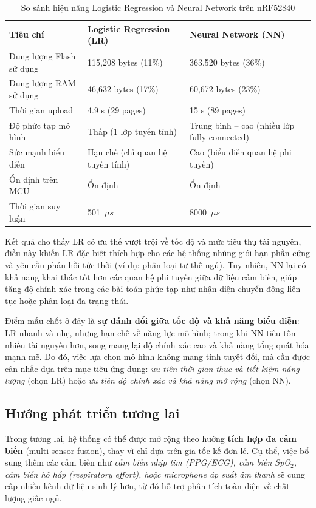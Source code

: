 \begin{table}[H]
\centering
\caption{So sánh hiệu năng Logistic Regression và Neural Network trên nRF52840}
\label{tab:comparison_full}
\begin{tabular}{|l|p{5cm}|p{6cm}|}
\hline
\textbf{Tiêu chí} & \textbf{Logistic Regression (LR)} & \textbf{Neural Network (NN)} \\ \hline
Dung lượng Flash sử dụng & 115,208 bytes (11\%) & 363,520 bytes (36\%) \\ \hline
Dung lượng RAM sử dụng   & 46,632 bytes (17\%)  & 60,672 bytes (23\%)  \\ \hline
Thời gian upload         & 4.9 s (29 pages)     & 15 s (89 pages)      \\ \hline
Độ phức tạp mô hình      & Thấp (1 lớp tuyến tính) & Trung bình -- cao (nhiều lớp fully connected) \\ \hline
Sức mạnh biểu diễn       & Hạn chế (chỉ quan hệ tuyến tính) & Cao (biểu diễn quan hệ phi tuyến) \\ \hline
Ổn định trên MCU         & Ổn định              & Ổn định \\ \hline
Thời gian suy luận       & 501~$\mu s$          & 8000~$\mu s$         \\ \hline
\end{tabular}
\end{table}


Kết quả cho thấy LR có ưu thế vượt trội về tốc độ và mức tiêu thụ tài nguyên, điều này khiến LR đặc biệt thích hợp cho các hệ thống nhúng giới hạn phần cứng và yêu cầu phản hồi tức thời (ví dụ: phân loại tư thế ngủ). Tuy nhiên, NN lại có khả năng khai thác tốt hơn các quan hệ phi tuyến giữa dữ liệu cảm biến, giúp tăng độ chính xác trong các bài toán phức tạp như nhận diện chuyển động liên tục hoặc phân loại đa trạng thái. 

Điểm mấu chốt ở đây là \textbf{sự đánh đổi giữa tốc độ và khả năng biểu diễn}: LR nhanh và nhẹ, nhưng hạn chế về năng lực mô hình; trong khi NN tiêu tốn nhiều tài nguyên hơn, song mang lại độ chính xác cao và khả năng tổng quát hóa mạnh mẽ. Do đó, việc lựa chọn mô hình không mang tính tuyệt đối, mà cần được cân nhắc dựa trên mục tiêu ứng dụng: \textit{ưu tiên thời gian thực và tiết kiệm năng lượng} (chọn LR) hoặc \textit{ưu tiên độ chính xác và khả năng mở rộng} (chọn NN).


\subsection*{Hướng phát triển tương lai}
Trong tương lai, hệ thống có thể được mở rộng theo hướng \textbf{tích hợp đa cảm biến} 
(multi-sensor fusion), thay vì chỉ dựa trên gia tốc kế đơn lẻ. 
Cụ thể, việc bổ sung thêm các cảm biến như \textit{cảm biến nhịp tim (PPG/ECG), cảm biến SpO$_2$, 
cảm biến hô hấp (respiratory effort), hoặc microphone áp suất âm thanh} 
sẽ cung cấp nhiều kênh dữ liệu sinh lý hơn, từ đó hỗ trợ phân tích toàn diện về chất lượng giấc ngủ. 

